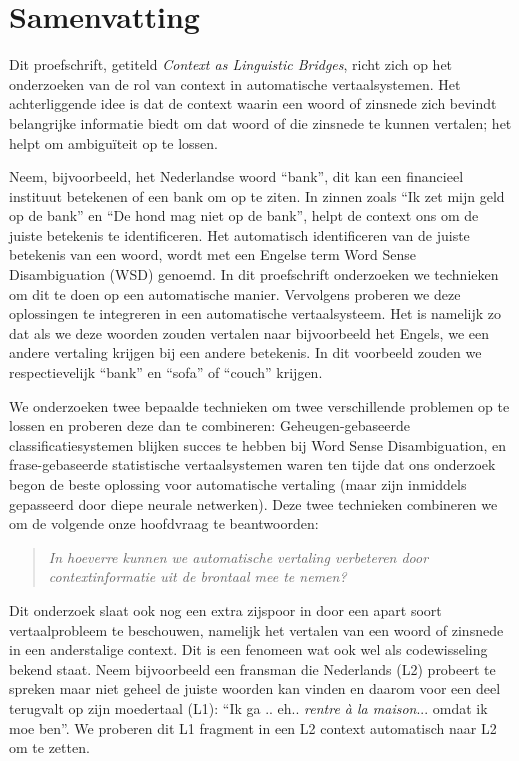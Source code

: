\chapter*{Samenvatting}

Dit proefschrift, getiteld \emph{Context as Linguistic Bridges}, richt zich op het onderzoeken van de rol van context in
automatische vertaalsystemen. Het achterliggende idee is dat de context waarin een woord of zinsnede zich bevindt
belangrijke informatie biedt om dat woord of die zinsnede te kunnen vertalen; het helpt om ambiguïteit op te lossen.

Neem, bijvoorbeeld, het Nederlandse woord ``bank'', dit kan een financieel instituut betekenen of een bank om op te
ziten. In zinnen zoals ``Ik zet mijn geld op de bank'' en ``De hond mag niet op de bank'', helpt de context ons om de
juiste betekenis te identificeren. Het automatisch identificeren van de juiste betekenis van een woord, wordt met een Engelse
term  Word Sense Disambiguation (WSD) genoemd. In dit proefschrift onderzoeken we technieken om dit te doen op een
automatische manier. Vervolgens proberen we deze oplossingen te integreren in een automatische vertaalsysteem. Het is
namelijk zo dat als we deze woorden zouden vertalen naar bijvoorbeeld het Engels, we een andere vertaling krijgen bij
een andere betekenis. In dit voorbeeld zouden we respectievelijk ``bank'' en ``sofa'' of ``couch'' krijgen.

We onderzoeken twee bepaalde technieken om twee verschillende problemen op te lossen en proberen deze dan te
combineren: Geheugen-gebaseerde classificatiesystemen blijken succes te hebben bij Word Sense Disambiguation, en
frase-gebaseerde statistische vertaalsystemen waren ten tijde dat ons onderzoek begon de beste oplossing voor
automatische vertaling (maar zijn inmiddels gepasseerd door diepe neurale netwerken). Deze twee technieken combineren we
om de volgende onze hoofdvraag te beantwoorden:

\begin{quote}
\emph{In hoeverre kunnen we automatische vertaling verbeteren door contextinformatie uit de brontaal mee te nemen?}
\end{quote}

Dit onderzoek slaat ook nog een extra zijspoor in door een apart soort vertaalprobleem te beschouwen, namelijk het vertalen
van een woord of zinsnede in een anderstalige context. Dit is een fenomeen wat ook wel als codewisseling bekend staat. Neem
bijvoorbeeld een fransman die Nederlands (L2) probeert te spreken maar niet geheel de juiste woorden kan vinden en
daarom voor een deel terugvalt op zijn moedertaal (L1): ``Ik ga .. eh.. \emph{rentre à la maison}... omdat ik moe ben''.
We proberen dit L1 fragment in een L2 context automatisch naar L2 om te zetten.

